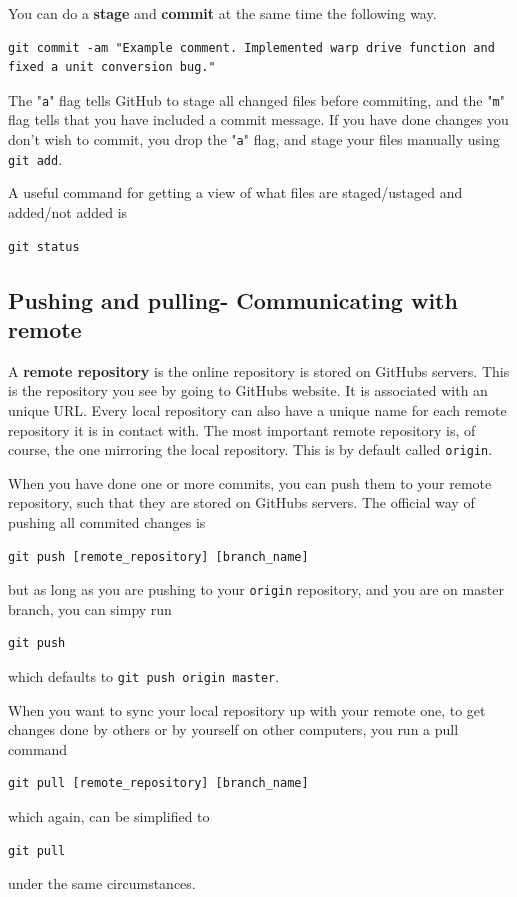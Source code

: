 \documentclass[12p,a4paper]{article}
\begin{document}
You can do a \textbf{stage} and \textbf{commit} at the same time the following way.
\begin{verbatim}
git commit -am "Example comment. Implemented warp drive function and fixed a unit conversion bug."
\end{verbatim}
The "\texttt{a}" flag tells GitHub to stage all changed files before commiting, and the "\texttt{m}" flag tells that you have included a commit message. If you have done changes you don't wish to commit, you drop the "\texttt{a}" flag, and stage your files manually using \texttt{git add}.

A useful command for getting a view of what files are staged/ustaged and added/not added is
\begin{verbatim}
git status
\end{verbatim}

\subsection{Pushing and pulling- Communicating with remote}
A \textbf{remote repository} is the online repository is stored on GitHubs servers. This is the repository you see by going to GitHubs website. It is associated with an unique URL. Every local repository can also have a unique name for each remote repository it is in contact with. The most important remote repository is, of course, the one mirroring the local repository. This is by default called \texttt{origin}.

When you have done one or more commits, you can push them to your remote repository, such that they are stored on GitHubs servers. The official way of pushing all commited changes is
\begin{verbatim}
git push [remote_repository] [branch_name]
\end{verbatim}
but as long as you are pushing to your \texttt{origin} repository, and you are on master branch, you can simpy run
\begin{verbatim}
git push
\end{verbatim}
which defaults to \texttt{git push origin master}.

When you want to sync your local repository up with your remote one, to get changes done by others or by yourself on other computers, you run a pull command
\begin{verbatim}
git pull [remote_repository] [branch_name]
\end{verbatim}
which again, can be simplified to 
\begin{verbatim}
git pull
\end{verbatim}
under the same circumstances.
\end{document}
